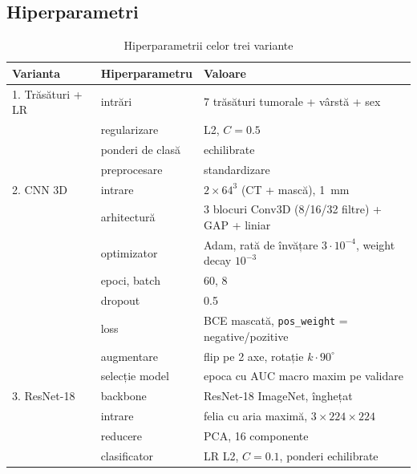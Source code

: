 \documentclass[runningheads,a4paper,11pt]{report}
\begin{document}
\subsection{Hiperparametri}

\begin{table}[htbp]
    \centering
    \renewcommand{\arraystretch}{1.3}
    \begin{tabular}{lll}
        \toprule
        \textbf{Varianta} & \textbf{Hiperparametru} & \textbf{Valoare} \\
        \midrule
        1. Trăsături + LR & intrări & 7 trăsături tumorale + vârstă + sex \\
                          & regularizare & L2, $C = 0.5$ \\
                          & ponderi de clasă & echilibrate \\
                          & preprocesare & standardizare \\
        \midrule
        2. CNN 3D & intrare & $2 \times 64^3$ (CT + mască), 1~mm \\
                  & arhitectură & 3 blocuri Conv3D (8/16/32 filtre) + GAP + liniar \\
                  & optimizator & Adam, rată de învățare $3 \cdot 10^{-4}$, weight decay $10^{-3}$ \\
                  & epoci, batch & 60, 8 \\
                  & dropout & 0.5 \\
                  & loss & BCE mascată, \texttt{pos\_weight} = negative/pozitive \\
                  & augmentare & flip pe 2 axe, rotație $k \cdot 90^\circ$ \\
                  & selecție model & epoca cu AUC macro maxim pe validare \\
        \midrule
        3. ResNet-18 & backbone & ResNet-18 ImageNet, înghețat \\
                     & intrare & felia cu aria maximă, $3 \times 224 \times 224$ \\
                     & reducere & PCA, 16 componente \\
                     & clasificator & LR L2, $C = 0.1$, ponderi echilibrate \\
        \bottomrule
    \end{tabular}
    \caption{Hiperparametrii celor trei variante}
    \label{tab:hiperparametri}
\end{table}
\end{document}
